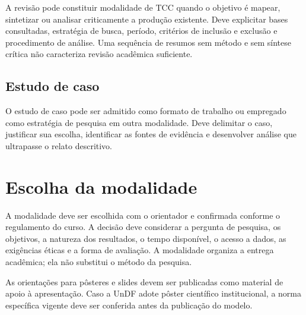 A revisão pode constituir modalidade de TCC quando o objetivo é mapear, sintetizar ou analisar criticamente a produção existente. Deve explicitar bases consultadas, estratégia de busca, período, critérios de inclusão e exclusão e procedimento de análise. Uma sequência de resumos sem método e sem síntese crítica não caracteriza revisão acadêmica suficiente.

\subsection{Estudo de caso}

O estudo de caso pode ser admitido como formato de trabalho ou empregado como estratégia de pesquisa em outra modalidade. Deve delimitar o caso, justificar sua escolha, identificar as fontes de evidência e desenvolver análise que ultrapasse o relato descritivo.

\section{Escolha da modalidade}

A modalidade deve ser escolhida com o orientador e confirmada conforme o regulamento do curso. A decisão deve considerar a pergunta de pesquisa, os objetivos, a natureza dos resultados, o tempo disponível, o acesso a dados, as exigências éticas e a forma de avaliação. A modalidade organiza a entrega acadêmica; ela não substitui o método da pesquisa.


As orientações para pôsteres e slides devem ser publicadas como material de apoio à apresentação. Caso a UnDF adote pôster científico institucional, a norma específica vigente deve ser conferida antes da publicação do modelo.
